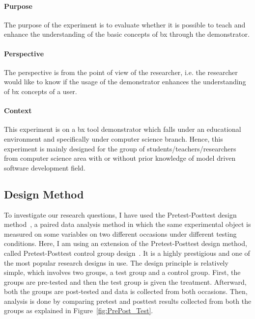 \paragraph{Purpose}
The purpose of the experiment is to evaluate whether it is possible to teach and enhance the understanding of the basic concepts of bx through the demonstrator.

\paragraph{Perspective}
The perspective is from the point of view of the researcher, i.e. the researcher would like to know if the usage of the demonstrator enhances the understanding of bx concepts of a user.

\paragraph{Context}
This experiment is on a bx tool demonstrator which falls under an educational environment and specifically under computer science branch. Hence, this experiment is mainly designed for the group of students/teachers/researchers from computer science area with or without prior knowledge of model driven software development field.

\subsection{Design Method}\label{subsec:designmethod} 
To investigate our research questions, I have used the Pretest-Posttest design method~\cite{analysisprepostdesigns}, a paired data analysis method in which the same experimental object is measured on some variables on two different occasions under different testing conditions. Here, I am using an extension of the Pretest-Posttest design method, called Pretest-Posttest control group design~\cite{expandquasiexpdesign}. It is a highly prestigious and one of the most popular research designs in use. The design principle is relatively simple, which involves two groups, a test group and a control group. First, the groups are pre-tested and then the test group is given the treatment. Afterward, both the groups are post-tested and data is collected from both occasions. Then, analysis is done by comparing pretest and posttest results collected from both the groups as explained in Figure~\ref{fig:PrePost_Test}.

